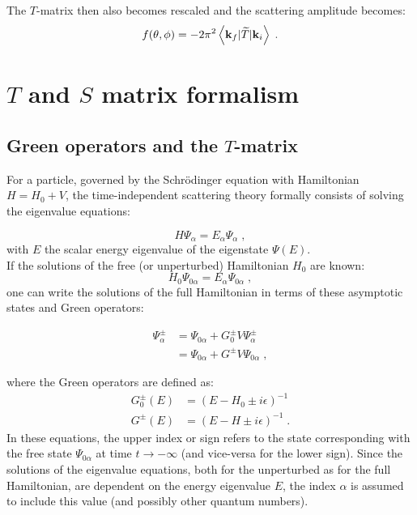 The $T$-matrix then also becomes rescaled and the scattering amplitude becomes:
\begin{equation*}
  f(\theta, \phi) = -2\pi^2 \left\langle \mathbf{k}_f \vert \widetilde{T} \vert \mathbf{k}_i \right\rangle \; .
\end{equation*}


\section{\boldmath$T$ and $S$ matrix formalism}


\subsection{Green operators and the $T$-matrix}

For a particle, governed by the Schr\"odinger equation with Hamiltonian $H = H_0 + V$, the time-independent scattering theory formally consists of solving the eigenvalue equations:

\begin{equation*}
  H\Psi_\alpha = E_\alpha\Psi_\alpha \; ,
\end{equation*}
with $E$ the scalar energy eigenvalue of the eigenstate $\Psi(E)$.\\
If the solutions of the free (or unperturbed) Hamiltonian $H_0$ are known:
\begin{equation*}
  H_0\Psi_{0\alpha} = E_\alpha\Psi_{0\alpha} \; ,
\end{equation*}
one can write the solutions of the full Hamiltonian in terms of these asymptotic states and Green operators:

\begin{align*}
  \Psi^\pm_\alpha &= \Psi_{0\alpha} + G^\pm_0 V \Psi^\pm_\alpha  \\
  & = \Psi_{0\alpha} + G^\pm V  \Psi_{0\alpha} \; ,
\end{align*}

where the Green operators are defined as:
\begin{align*}
  G^\pm_0(E) &= (E-H_0\pm i\epsilon )^{-1}  \\
  G^\pm (E) &= (E-H\pm i\epsilon )^{-1} \; .
\end{align*}
In these equations, the upper index or sign refers to the state corresponding with the free state $\Psi_{0\alpha}$ at time $t\rightarrow - \infty$ (and vice-versa for the lower sign). Since the solutions of the eigenvalue equations, both for the unperturbed as for the full Hamiltonian, are dependent on the energy eigenvalue $E$, the index $\alpha$ is assumed to include this value (and possibly other quantum numbers).

